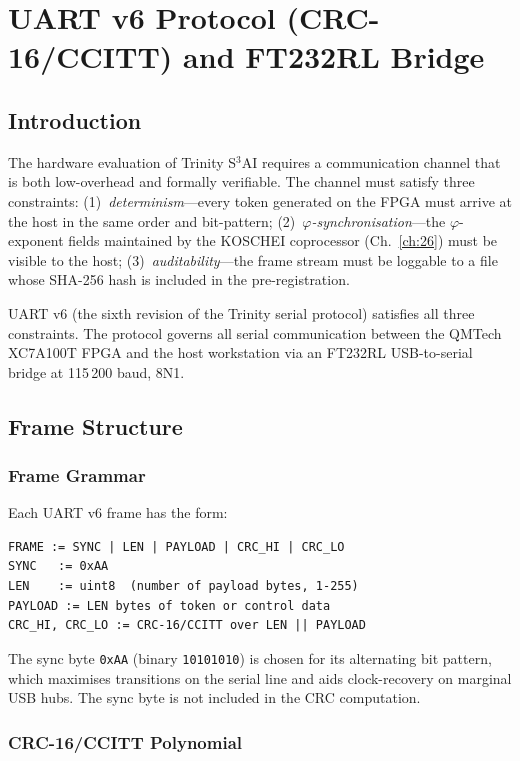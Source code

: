 \chapter{UART v6 Protocol (CRC-16/CCITT) and FT232RL Bridge}
\label{ch:32b}

\section{Introduction}

The hardware evaluation of Trinity S$^3$AI requires a communication channel that is both low-overhead and formally verifiable. The channel must satisfy three constraints: (1)~\emph{determinism}---every token generated on the FPGA must arrive at the host in the same order and bit-pattern; (2)~\emph{$\varphi$-synchronisation}---the $\varphi$-exponent fields maintained by the KOSCHEI coprocessor (Ch.~\ref{ch:26}) must be visible to the host; (3)~\emph{auditability}---the frame stream must be loggable to a file whose SHA-256 hash is included in the pre-registration.

UART v6 (the sixth revision of the Trinity serial protocol) satisfies all three constraints. The protocol governs all serial communication between the QMTech XC7A100T FPGA and the host workstation via an FT232RL USB-to-serial bridge at 115\,200 baud, 8N1.

\section{Frame Structure}

\subsection{Frame Grammar}

Each UART v6 frame has the form:
\begin{verbatim}
FRAME := SYNC | LEN | PAYLOAD | CRC_HI | CRC_LO
SYNC   := 0xAA
LEN    := uint8  (number of payload bytes, 1-255)
PAYLOAD := LEN bytes of token or control data
CRC_HI, CRC_LO := CRC-16/CCITT over LEN || PAYLOAD
\end{verbatim}

The sync byte \texttt{0xAA} (binary \texttt{10101010}) is chosen for its alternating bit pattern, which maximises transitions on the serial line and aids clock-recovery on marginal USB hubs. The sync byte is not included in the CRC computation.

\subsection{CRC-16/CCITT Polynomial}

